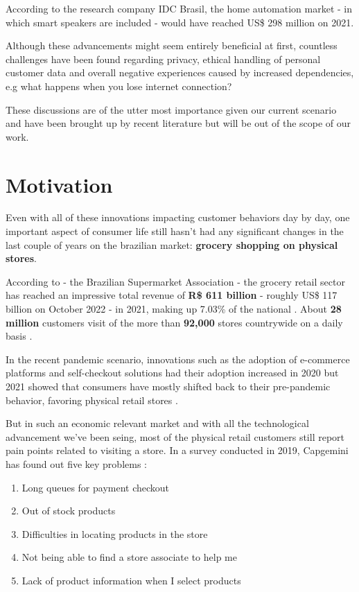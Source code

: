 \documentclass[openright]{normas-utf-tex} %
\begin{document}
According to the research company IDC Brasil, the home automation market - in
which smart speakers are included - would have reached US\$ 298 million on
2021.

Although these advancements might seem entirely beneficial at first, countless
challenges have been found regarding privacy, ethical handling of personal
customer data and overall negative experiences caused by increased
dependencies, e.g what happens when you lose internet connection?

These discussions are of the utter most importance given our current scenario
and have been brought up by recent literature \cite{Echoes2022,He2019}
but will be out of the scope of our work.

\section{Motivation}

Even with all of these innovations impacting customer behaviors day by day, one
important aspect of consumer life still hasn't had any significant changes in
the last couple of years on the brazilian market: \textbf{grocery shopping on
physical stores}.

According to  - the
Brazilian Supermarket Association - the grocery retail sector has reached an
impressive total revenue of \textbf{R\$ 611 billion} - roughly US\$ 117 billion on
October 2022 - in 2021, making up 7.03\% of the national . About \textbf{28 million} customers visit of the more than
\textbf{92,000} stores countrywide on a daily basis \cite{Abras2022}.

In the recent pandemic scenario, innovations such as the adoption of e-commerce platforms and
self-checkout solutions had their adoption increased in 2020 but 2021 showed that consumers have
mostly shifted back to their pre-pandemic behavior, favoring physical retail stores \cite{Kantar2022}.

But in such an economic relevant market and with all the technological
advancement we've been seing, most of the physical retail customers still
report pain points related to visiting a store. In a survey conducted in 2019,
Capgemini has found out five key problems \cite{Capgemini2020}:

\begin{enumerate}
        \item Long queues for payment checkout
        \item Out of stock products
        \item Difficulties in locating products in the store
        \item Not being able to find a store associate to help me
        \item Lack of product information when I select products
\end{enumerate}
\end{document}

